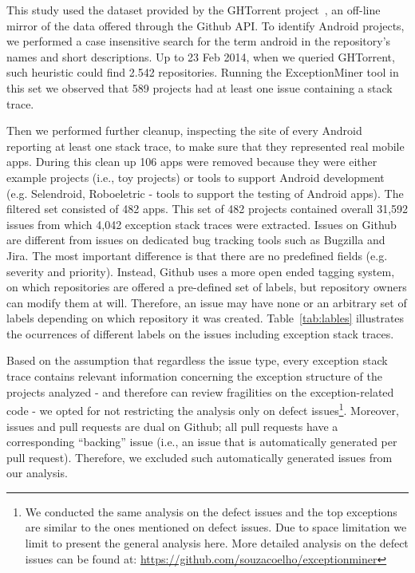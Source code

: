 \documentclass[conference]{IEEEtran}
\begin{document}

This study used the dataset provided by the GHTorrent project~\cite{Gousi13}, 
an off-line mirror of the data  offered through the Github API.  
To identify Android projects, we performed a case insensitive search for the
term \textsf{android} in the repository's names and short descriptions.  
Up to 23 Feb 2014,  when we queried GHTorrent, such heuristic could
 find 2.542 repositories. Running the ExceptionMiner tool 
 in this set we observed that 589 projects had at least one issue containing a stack trace.
	
Then we performed further cleanup, inspecting the site of every Android
reporting at least one stack trace, to make sure that they represented real
mobile apps. During this clean up 106 apps were removed because they were either
example projects (i.e., toy projects) or tools to support Android development
(e.g. Selendroid, Roboeletric - tools to support the testing of Android apps).
The filtered set consisted of 482 apps. This set of 482 projects contained overall 31,592 issues from which 4,042 exception stack traces 
were extracted. Issues on Github are different from issues on dedicated bug tracking tools such as 
Bugzilla and Jira. The most important difference is that there are no predefined fields
  (e.g. severity and priority). Instead, Github uses a more open ended tagging system, on which
repositories are offered a pre-defined set of labels, but repository owners can modify 
them at will. Therefore, an issue may have none or an arbitrary set of labels depending 
on which repository it was created. Table~\ref{tab:lables} illustrates the ocurrences of different labels 
on the issues including exception stack traces.

Based on the assumption that regardless the issue type, every exception stack
trace contains relevant information concerning the exception structure of the
projects analyzed - and therefore can review fragilities on the exception-related code -  
we opted for not restricting the analysis only on defect
issues\footnote{We conducted the same analysis on the defect issues and the top
exceptions are similar to the ones mentioned on defect issues. Due to space
limitation we limit to present the general analysis here. More detailed analysis
on the defect issues can be found at:
\url{https://github.com/souzacoelho/exceptionminer}}.
 Moreover, issues and pull requests are dual on Github; all pull requests have a corresponding 
``backing'' issue (i.e., an issue that is automatically generated per pull request). Therefore, we excluded such automatically generated
issues from our analysis. 
\end{document}
